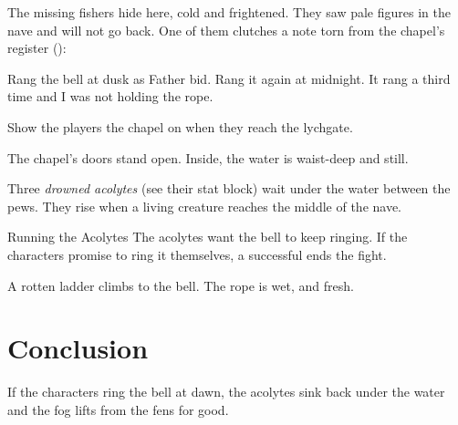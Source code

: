 \documentclass[letterpaper,twoside,twocolumn,openany,nodeprecatedcode,
  fonts=solbera,srd=5.1]{dndbook}
\begin{document}
The missing fishers hide here, cold and frightened. They saw pale figures in the nave and will not go back. One of them clutches a note torn from the chapel's register ():

\begin{DndHandout}[style=note, title={The Register Page}, label=register, appendix]
  Rang the bell at dusk as Father bid. Rang it again at midnight. It rang a third time and I was not holding the rope.
\end{DndHandout}

Show the players the chapel on  when they reach the lychgate.


The chapel's doors stand open. Inside, the water is waist-deep and still.

Three \emph{drowned acolytes} (see their stat block) wait under the water between the pews. They rise when a living creature reaches the middle of the nave.

\begin{DndSidebar}[float=!b]{Running the Acolytes}
  The acolytes want the bell to keep ringing. If the characters promise to ring it themselves, a successful  ends the fight.
\end{DndSidebar}

A rotten ladder climbs to the bell. The rope is wet, and fresh.

\section{Conclusion}

If the characters ring the bell at dawn, the acolytes sink back under the water and the fog lifts from the fens for good.

\appendix
\DndHandoutAppendix

\end{document}
